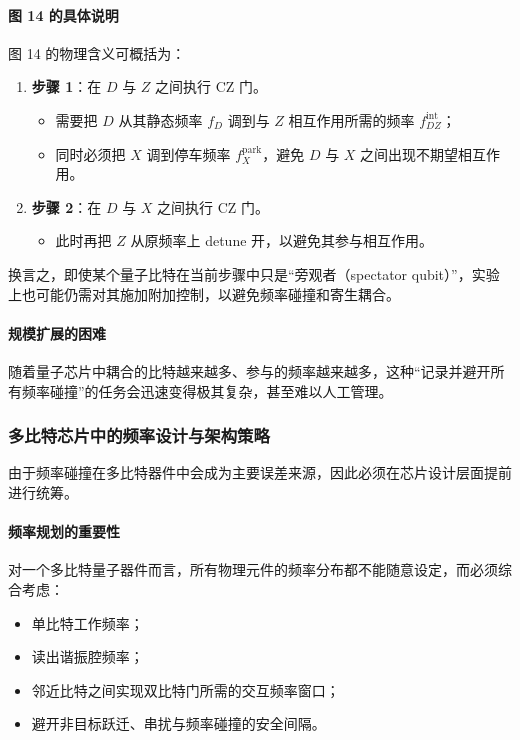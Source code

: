 \documentclass[12pt,a4paper,oneside]{ctexbook}
\begin{document}
\paragraph{图 14 的具体说明}
图 14 的物理含义可概括为：

\begin{enumerate}
    \item \textbf{步骤 1}：在 \(D\) 与 \(Z\) 之间执行 CZ 门。
    \begin{itemize}
        \item 需要把 \(D\) 从其静态频率 \(f_D\) 调到与 \(Z\) 相互作用所需的频率 \(f^{\mathrm{int}}_{DZ}\)；
        \item 同时必须把 \(X\) 调到停车频率 \(f_X^{\mathrm{park}}\)，避免 \(D\) 与 \(X\) 之间出现不期望相互作用。
    \end{itemize}

    \item \textbf{步骤 2}：在 \(D\) 与 \(X\) 之间执行 CZ 门。
    \begin{itemize}
        \item 此时再把 \(Z\) 从原频率上 detune 开，以避免其参与相互作用。
    \end{itemize}
\end{enumerate}

换言之，即使某个量子比特在当前步骤中只是“旁观者（spectator qubit）”，实验上也可能仍需对其施加附加控制，以避免频率碰撞和寄生耦合。

\paragraph{规模扩展的困难}
随着量子芯片中耦合的比特越来越多、参与的频率越来越多，这种“记录并避开所有频率碰撞”的任务会迅速变得极其复杂，甚至难以人工管理。

\subsubsection{多比特芯片中的频率设计与架构策略}

由于频率碰撞在多比特器件中会成为主要误差来源，因此必须在芯片设计层面提前进行统筹。

\paragraph{频率规划的重要性}
对一个多比特量子器件而言，所有物理元件的频率分布都不能随意设定，而必须综合考虑：
\begin{itemize}
    \item 单比特工作频率；
    \item 读出谐振腔频率；
    \item 邻近比特之间实现双比特门所需的交互频率窗口；
    \item 避开非目标跃迁、串扰与频率碰撞的安全间隔。
\end{itemize}
\end{document}
